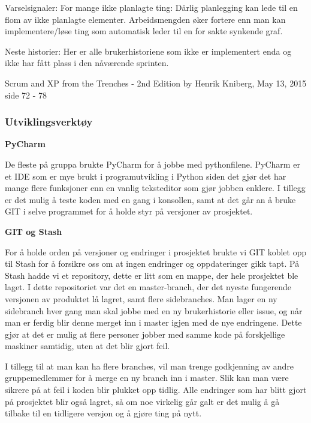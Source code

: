 \documentclass[12pt,a4paper,norsk]{article}
\begin{document}
    Varselsignaler:
	For mange ikke planlagte ting:
    Dårlig planlegging kan lede til en flom av ikke planlagte elementer. Arbeidsmengden øker fortere enn man kan implementere/løse ting som automatisk leder til en for sakte synkende graf.

    Neste historier:
    Her er alle brukerhistoriene som ikke er implementert enda og ikke har fått plass i den nåværende sprinten.

    Scrum and XP from the Trenches - 2nd Edition by Henrik Kniberg, May 13, 2015 side 72 - 78


	\subsubsection{Utviklingsverktøy}

\textbf{PyCharm}
\par De fleste på gruppa brukte PyCharm for å jobbe med pythonfilene. PyCharm er et IDE som er mye brukt i programutvikling i Python siden det gjør det har mange flere funksjoner enn en vanlig teksteditor som gjør jobben enklere. I tillegg er det mulig å teste koden med en gang i konsollen, samt at det går an å bruke GIT i selve programmet for å holde styr på versjoner av prosjektet.

\bigskip \noindent \textbf{GIT og Stash}
\par For å holde orden på versjoner og endringer i prosjektet brukte vi GIT koblet opp til Stash for å forsikre oss om at ingen endringer og oppdateringer gikk tapt. På Stash hadde vi et repository, dette er litt som en mappe, der hele prosjektet ble laget. I dette repositoriet var det en master-branch, der det nyeste fungerende versjonen av produktet lå lagret, samt flere sidebranches. Man lager en ny sidebranch hver gang man skal jobbe med en ny brukerhistorie eller issue, og når man er ferdig blir denne merget inn i master igjen med de nye endringene. Dette gjør at det er mulig at flere personer jobber med samme kode på forskjellige maskiner samtidig, uten at det blir gjort feil.

I tillegg til at man kan ha flere branches, vil man trenge godkjenning av andre gruppemedlemmer for å merge en ny branch inn i master. Slik kan man være sikrere på at feil i koden blir plukket opp tidlig. Alle endringer som har blitt gjort på prosjektet blir også lagret, så om noe virkelig går galt er det mulig å gå tilbake til en tidligere versjon og å gjøre ting på nytt.
\end{document}
